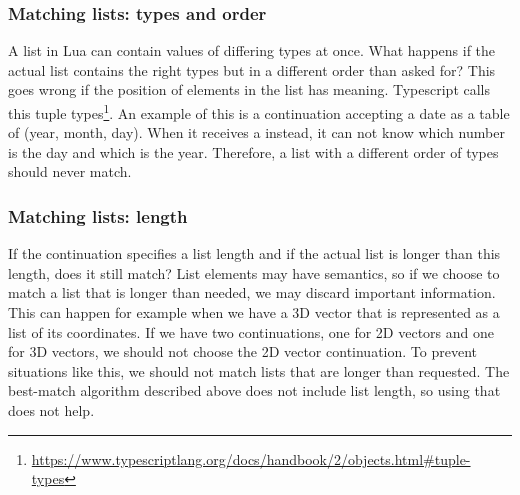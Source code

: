 \subsubsection{Matching lists: types and order}
A list in Lua can contain values of differing types at once. What happens if the actual list contains the right types but in a different order than asked for?
This goes wrong if the position of elements in the list has meaning. Typescript calls this tuple types\footnote{\label{footnote-typescript-tuple-types}\url{https://www.typescriptlang.org/docs/handbook/2/objects.html\#tuple-types}}. An example of this is a continuation accepting a date as a table of  (year, month, day). When it receives a  instead, it can not know which number is the day and which is the year. Therefore, a list with a different order of types should never match.


\subsubsection{Matching lists: length}
If the continuation specifies a list length and if the actual list is longer than this length, does it still match? List elements may have semantics, so if we choose to match a list that is longer than needed, we may discard important information. This can happen for example when we have a 3D vector that is represented as a list of its coordinates. If we have two continuations, one for 2D vectors and one for 3D vectors, we should not choose the 2D vector continuation. To prevent situations like this, we should not match lists that are longer than requested. The best-match algorithm described above does not include list length, so using that does not help.



